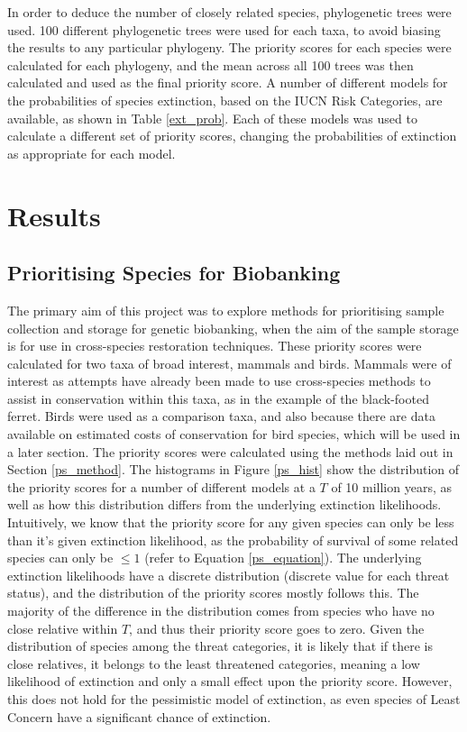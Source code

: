\documentclass[10pt]{article}
\begin{document}
	

	In order to deduce the number of closely related species, phylogenetic trees were used. 100 different phylogenetic trees were used for each taxa, to avoid biasing the results to any particular phylogeny. The priority scores for each species were calculated for each phylogeny, and the mean across all 100 trees was then calculated and used as the final
	priority score. A number of different models for the probabilities of species
	extinction, based on the IUCN Risk Categories, are available, as shown in Table \ref{ext_prob}.
	Each of these models was used to
	calculate a different set of priority scores, changing the probabilities of extinction as
	appropriate for each model.
	
	\section{Results}
	\subsection{Prioritising Species for Biobanking}
	The primary aim of this project was to explore methods for prioritising sample collection and
	storage for genetic biobanking, when the aim of the sample storage is for use in cross-species
	restoration techniques. These priority scores were calculated for two taxa of broad interest,
	mammals and birds. Mammals were of interest as attempts have already been made to use
	cross-species methods to assist in conservation within this taxa, as in the example of the
	black-footed ferret. Birds were used as a comparison taxa, and also because there are data
	available on estimated costs of conservation for bird species, which will be used in a later section. The priority scores were calculated using the methods laid out in Section 
	\ref{ps_method}. The histograms in Figure \ref{ps_hist} show the distribution of the priority
	scores for a number of different models at a $T$ of 10 million years, as well as how this
	distribution differs from the underlying extinction likelihoods. Intuitively, we know that
	the priority score for any given species can only be less than it's given extinction likelihood,
	as the probability of survival of some related species can only be $\le 1$ (refer to Equation \ref{ps_equation}). The underlying extinction likelihoods have a discrete distribution (discrete
	value for each threat status), and the distribution of the priority scores mostly follows this.
	The majority of the difference in the distribution comes from species who have no close relative
	within $T$, and thus their priority score goes to zero. Given the distribution of species among
	the threat categories, it is likely that if there is close relatives, it belongs to the least
	threatened categories, meaning a low likelihood of extinction and only a small effect upon the
	priority score. However, this does not hold for the pessimistic model of extinction, as even
	species of Least Concern have a significant chance of extinction.
	
\end{document}
